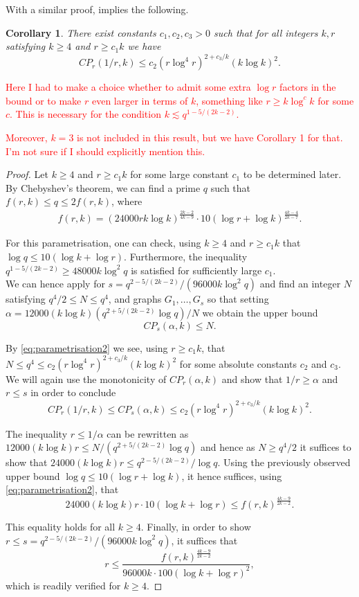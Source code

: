 \documentclass[12pt]{article}
\newcommand{\red}[1]{\textcolor{red}{#1}}
\newtheorem{corollary}{Corollary}
\theoremstyle{definition}
\begin{document}
	With a similar proof,  implies the following.
	
	\begin{corollary}\label{cor:CP2}
		There exist constants $c_1,c_2,c_3 > 0$ such that for all integers $k,r$ satisfying $k \geq 4$ and $r \geq c_1k$ we have 
		\[CP_r(1/r,k) \leq c_2 (r\log^4 r)^{2+c_3/k}(k\log k)^2.\]
	\end{corollary}
	
	\red{Here I had to make a choice whether to admit some extra $\log r$ factors in the bound or to make $r$ even larger in terms of $k$, something like $r \geq k\log^c k$ for some $c$. This is necessary for the condition $k \lesssim q^{1-5/(2k-2)}$.}
	
	\red{Moreover, $k = 3$ is not included in this result, but we have Corollary 1 for that. I'm not sure if I should explicitly mention this.}
	
	\begin{proof}
		Let $k \geq 4$ and $r \geq c_1k$ for some large constant $c_1$ to be determined later. By Chebyshev's theorem, we can find a prime $q$ such that $f(r,k) \leq q \leq 2f(r,k)$, where
		\begin{align}\label{eq:parametrisation2}
			f(r,k) =(24000rk\log k)^{\frac{2k-2}{4k-9}}\cdot 10(\log r+\log k)^{\frac{4k-4}{2k-7}}.
		\end{align}
		
		For this parametrisation, one can check, using $k \geq 4$ and $r \geq c_1k$ that $\log q \leq 10(\log k+\log r)$. Furthermore, the inequality $q^{1-5/(2k-2)} \geq 48000k\log^2q$ is satisfied for sufficiently large $c_1$. \\
		
		We can hence apply  for $s = q^{2-5/(2k-2)}/(96000k\log^2 q)$ and find an integer $N$ satisfying $q^4/2 \leq N \leq q^4$, and graphs $G_1,\dots,G_s$ so that setting $\alpha = 12000(k\log k)(q^{2+5/(2k-2)}\log q)/N$ we obtain the upper bound
		\[CP_s(\alpha,k) \leq N.\]
		
		By \eqref{eq:parametrisation2} we see, using $r \geq c_1k$, that $N \leq q^4 \leq c_2 (r\log^4 r)^{2+c_3/k}(k\log k)^2$ for some absolute constants $c_2$ and $c_3$. We will again use the monotonicity of $CP_r(\alpha,k)$ and show that $1/r \geq \alpha$ and $r \leq s$ in order to conclude
		\[CP_r(1/r,k) \leq CP_s(\alpha,k) \leq c_2 (r\log^4 r)^{2+c_3/k}(k\log k)^2.\]
		
		The inequality $r \leq 1/\alpha$ can be rewritten as $12000(k\log k)r \leq N/(q^{2+5/(2k-2)}\log q)$ and hence as $N \geq q^4/2$ it suffices to show that $24000(k\log k)r \leq q^{2-5/(2k-2)}/\log q$. Using the previously observed upper bound $\log q \leq 10(\log r + \log k)$, it hence suffices, using \eqref{eq:parametrisation2}, that
		\[24000(k\log k)r\cdot 10(\log k + \log r) \leq f(r,k)^{\frac{4k-9}{2k-2}}.\]
		
		This equality holds for all $k \geq 4$. Finally, in order to show $r \leq s = q^{2-5/(2k-2)}/(96000k\log^2 q)$, it suffices that 
		\[r \leq \frac{f(r,k)^{\frac{4k-9}{2k-2}}}{96000k\cdot 100(\log k + \log r)^2},\]
		which is readily verified for $k \geq 4$.
	\end{proof}
	
\end{document}
